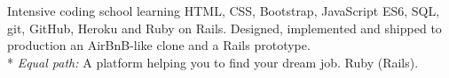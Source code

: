 \documentclass[11pt,a4paper,sans]{moderncv}
\begin{document}
{Intensive coding school learning HTML, CSS, Bootstrap, JavaScript ES6,
SQL, git, GitHub, Heroku and Ruby on Rails. Designed, implemented and shipped to
production an AirBnB-like clone and a Rails prototype. \\*
{{\textit{Equal path:} A platform helping you to find your dream job. Ruby (Rails). \href{https://youtu.be/hb8TT6Z1ptE?t=3828}   {} \href{http://equal-path.herokuapp.com/}   {}}
}}
\end{document}
